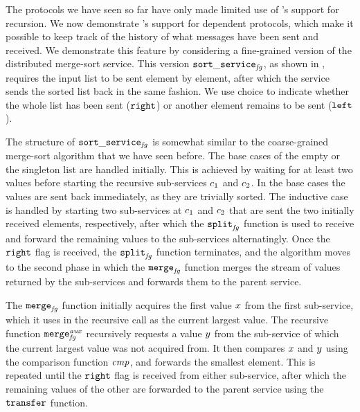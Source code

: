 The protocols we have seen so far have only made limited use of \lname's support
for recursion.
We now demonstrate \lname's support for dependent protocols, which make it
possible to keep track of the history of what messages have been sent and
received.
We demonstrate this feature by considering a fine-grained version of the
distributed merge-sort service.
This version $\mathtt{sort\_service}_{\mathit{fg}}$, as shown in ,
requires the input list to be sent element by element, after which the service
sends the sorted list back in the same fashion.
We use choice to indicate whether the whole list has been
sent ($\mathtt{right}$) or another element remains to be sent ($\mathtt{left}$).

\dependentfig

The structure of $\mathtt{sort\_service}_{\mathit{fg}}$ is somewhat similar to the
coarse-grained merge-sort algorithm that we have seen before.
The base cases of the empty or the singleton list are handled initially.
This is achieved by waiting for at least two values before starting
the recursive sub-services $c_1$ and $c_2$.
In the base cases the values are sent back immediately, as they are trivially
sorted.
The inductive case is handled by starting two sub-services at $c_1$ and
$c_2$ that are sent the two initially received elements, respectively,
after which the $\mathtt{split}_{\mathit{fg}}$ function is used to
receive and forward the remaining values to the sub-services alternatingly.
Once the $\mathtt{right}$ flag is received, the $\mathtt{split}_{\mathit{fg}}$
function terminates, and the algorithm moves to the second phase in which
the $\mathtt{merge}_{\mathit{fg}}$ function merges the stream of values
returned by the sub-services and forwards them to the parent service.

The $\mathtt{merge}_{\mathit{fg}}$ function initially acquires the first value
$x$ from the first sub-service, which it uses in the recursive call as the
current largest value.
The recursive function $\mathtt{merge}_{\mathit{fg}}^{\mathit{aux}}$ recursively requests
a value $y$ from the sub-service of which the current largest value was not
acquired from.
It then compares $x$ and $y$ using the comparison function $\mathit{cmp}$,
and forwards the smallest element.
This is repeated until the $\mathtt{right}$ flag is received from either sub-service,
after which the remaining values of the other are forwarded to the parent service
using the $\mathtt{transfer}$ function.

